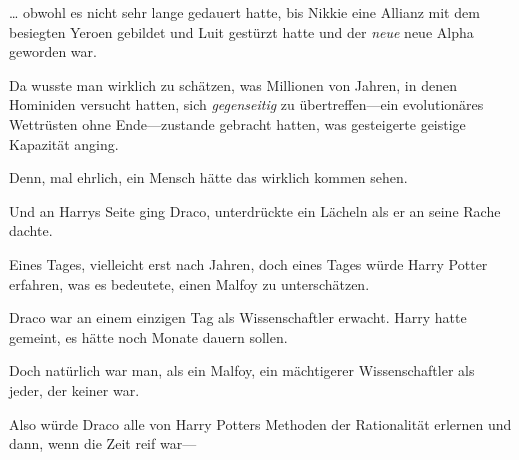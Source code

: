 … obwohl es nicht sehr lange gedauert hatte, bis Nikkie eine Allianz mit dem besiegten Yeroen gebildet und Luit gestürzt hatte und der \emph{neue} neue Alpha geworden war.

Da wusste man wirklich zu schätzen, was Millionen von Jahren, in denen Hominiden versucht hatten, sich \emph{gegenseitig} zu übertreffen—ein evolutionäres Wettrüsten ohne Ende—zustande gebracht hatten, was gesteigerte geistige Kapazität anging.

Denn, mal ehrlich, ein Mensch hätte das wirklich kommen sehen.

\later

Und an Harrys Seite ging Draco, unterdrückte ein Lächeln als er an seine Rache dachte.

Eines Tages, vielleicht erst nach Jahren, doch eines Tages würde Harry Potter erfahren, was es bedeutete, einen Malfoy zu unterschätzen.

Draco war an einem einzigen Tag als Wissenschaftler erwacht. Harry hatte gemeint, es hätte noch Monate dauern sollen.

Doch natürlich war man, als ein Malfoy, ein mächtigerer Wissenschaftler als jeder, der keiner war.

Also würde Draco alle von Harry Potters Methoden der Rationalität erlernen und dann, wenn die Zeit reif war—

